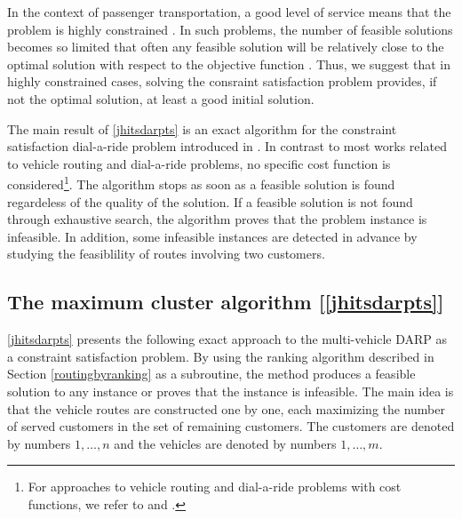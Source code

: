 \documentclass[dissertation,draft*]{aaltoseries}
\begin{document}
In the context of passenger transportation, a good level of service means that the problem is highly constrained \cite{jokinen-fists-2011}. 
In such problems, the number of feasible solutions becomes so limited that often
any feasible solution will be relatively close to the optimal solution with respect to the
objective function \cite{psaraftis02}.
Thus, we suggest that in highly constrained cases, solving the consraint satisfaction problem provides, 
if not the optimal solution, at least a good initial solution. 

The main result of \ref{jhitsdarpts} is an exact algorithm for the constraint satisfaction dial-a-ride problem
introduced in \cite{berbegliafeas}. In contrast to most works related to vehicle routing and dial-a-ride problems,
no specific cost function is considered\footnote{
For approaches to vehicle routing and dial-a-ride problems with cost functions, 
we refer to \cite{braysy01,braysy02,groer} and \cite{cordeau02,berbegliahybrid}.}. 
The algorithm stops as soon as a feasible solution is found regardeless of
the quality of the solution. If a feasible solution is not found through exhaustive search, the algorithm 
proves that the problem instance is infeasible. In addition, some infeasible instances are detected in advance
by studying the feasiblility of routes involving two customers. 


\subsection{The maximum cluster algorithm [\ref{jhitsdarpts}]}
\label{mvsolution}
\ref{jhitsdarpts} presents the following exact approach to the multi-vehicle DARP as a constraint satisfaction problem.
By using the ranking algorithm  described in Section \ref{routingbyranking} as a subroutine,
 the method produces a feasible solution to 
any instance or proves that the instance is infeasible. The main idea is that the vehicle routes are constructed
one by one, each maximizing the number of served customers in the set of remaining customers.
The customers are denoted by numbers $1,\ldots,n$ and the vehicles are denoted by numbers $1,\ldots,m$.
\end{document}
